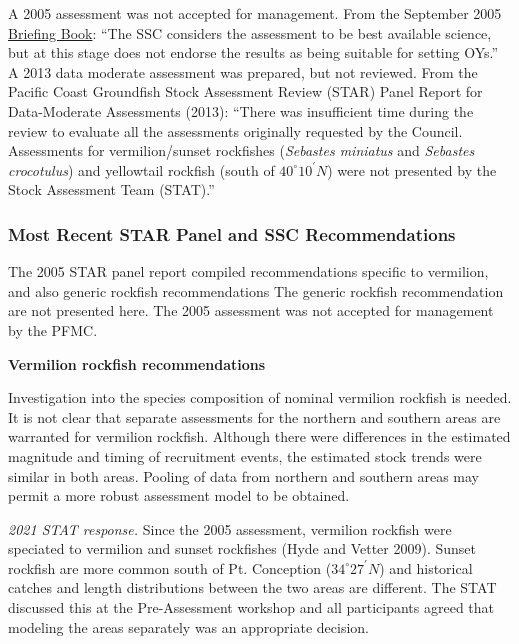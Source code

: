 \documentclass[
  english,
  a4paper,
]{article}
\begin{document}
A 2005 assessment was not accepted for management.
From the September 2005 \href{https://www.pcouncil.org/documents/2005/09/f-groundfish-management-september-2005.pdf/}{Briefing Book}:
``The SSC considers the assessment to be best available science, but at this stage does not
endorse the results as being suitable for setting OYs.'' A 2013 data moderate
assessment was prepared, but not reviewed. From the Pacific Coast Groundfish Stock
Assessment Review (STAR) Panel Report for Data-Moderate Assessments (2013):
``There was insufficient time during the review to evaluate all the assessments
originally requested by the Council. Assessments for vermilion/sunset rockfishes
(\emph{Sebastes miniatus} and \emph{Sebastes crocotulus}) and yellowtail rockfish
(south of $40^\circ 10^\prime N$) were not presented by the Stock Assessment Team (STAT).''

\hypertarget{most-recent-star-panel-and-ssc-recommendations}{%
\subsubsection{Most Recent STAR Panel and SSC Recommendations}\label{most-recent-star-panel-and-ssc-recommendations}}

The 2005 STAR panel report compiled recommendations specific to vermilion, and also
generic rockfish recommendations The generic rockfish recommendation are not
presented here. The 2005 assessment was not accepted for management by the PFMC.

\textbf{Vermilion rockfish recommendations}

Investigation into the species composition of nominal vermilion rockfish is needed.
It is not clear that separate assessments for the northern and southern areas are warranted
for vermilion rockfish. Although there were differences in the estimated magnitude and
timing of recruitment events, the estimated stock trends were similar in both areas.
Pooling of data from northern and southern areas may permit a more robust assessment
model to be obtained.

\emph{2021 STAT response.} Since the 2005 assessment, vermilion rockfish were speciated
to vermilion and sunset rockfishes (Hyde and Vetter 2009). Sunset rockfish are more common south of
Pt. Conception ($34^\circ 27^\prime N$) and historical catches and length distributions between
the two areas are different. The STAT discussed this at the Pre-Assessment workshop
and all participants agreed that modeling the areas separately was an appropriate
decision.
\end{document}
